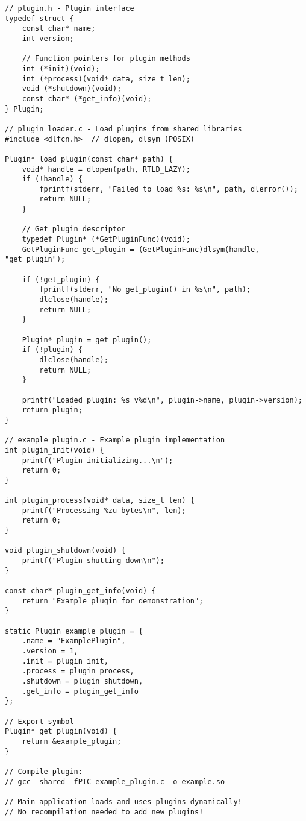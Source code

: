 \begin{lstlisting}
// plugin.h - Plugin interface
typedef struct {
    const char* name;
    int version;

    // Function pointers for plugin methods
    int (*init)(void);
    int (*process)(void* data, size_t len);
    void (*shutdown)(void);
    const char* (*get_info)(void);
} Plugin;

// plugin_loader.c - Load plugins from shared libraries
#include <dlfcn.h>  // dlopen, dlsym (POSIX)

Plugin* load_plugin(const char* path) {
    void* handle = dlopen(path, RTLD_LAZY);
    if (!handle) {
        fprintf(stderr, "Failed to load %s: %s\n", path, dlerror());
        return NULL;
    }

    // Get plugin descriptor
    typedef Plugin* (*GetPluginFunc)(void);
    GetPluginFunc get_plugin = (GetPluginFunc)dlsym(handle, "get_plugin");

    if (!get_plugin) {
        fprintf(stderr, "No get_plugin() in %s\n", path);
        dlclose(handle);
        return NULL;
    }

    Plugin* plugin = get_plugin();
    if (!plugin) {
        dlclose(handle);
        return NULL;
    }

    printf("Loaded plugin: %s v%d\n", plugin->name, plugin->version);
    return plugin;
}

// example_plugin.c - Example plugin implementation
int plugin_init(void) {
    printf("Plugin initializing...\n");
    return 0;
}

int plugin_process(void* data, size_t len) {
    printf("Processing %zu bytes\n", len);
    return 0;
}

void plugin_shutdown(void) {
    printf("Plugin shutting down\n");
}

const char* plugin_get_info(void) {
    return "Example plugin for demonstration";
}

static Plugin example_plugin = {
    .name = "ExamplePlugin",
    .version = 1,
    .init = plugin_init,
    .process = plugin_process,
    .shutdown = plugin_shutdown,
    .get_info = plugin_get_info
};

// Export symbol
Plugin* get_plugin(void) {
    return &example_plugin;
}

// Compile plugin:
// gcc -shared -fPIC example_plugin.c -o example.so

// Main application loads and uses plugins dynamically!
// No recompilation needed to add new plugins!
\end{lstlisting}

